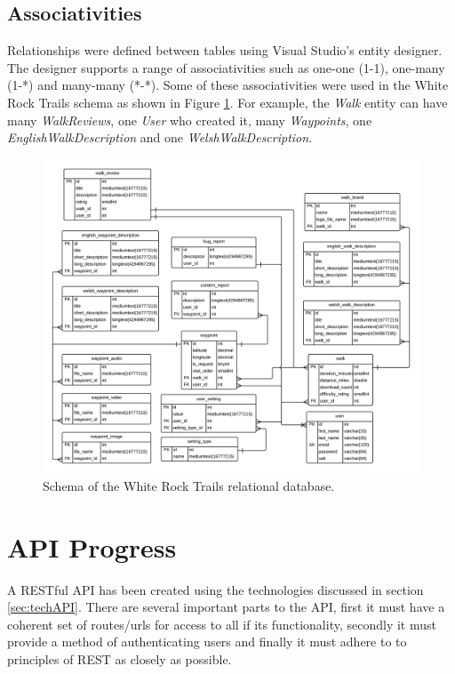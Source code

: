 \documentclass[11pt,a4paper]{article}
\begin{document}
\subsection{Associativities}

Relationships were defined between tables using Visual Studio's entity designer.
The designer supports a range of associativities such as one-one (1-1), one-many (1-*) and many-many (*-*).
Some of these associativities were used in the White Rock Trails schema as shown in Figure \ref{fig:DatabaseSchema}.
For example, the \emph{Walk} entity can have many \emph{WalkReviews}, one \emph{User} who created it, many \emph{Waypoints}, one \emph{EnglishWalkDescription} and one \emph{WelshWalkDescription}.

\begin{figure}[H]
\centering
\includegraphics[angle=90, width=1\textwidth]{./img/DatabaseSchema}
\caption{Schema of the White Rock Trails relational database.}
\label{fig:DatabaseSchema}
\end{figure}

\section{API Progress}

A RESTful API has been created using the technologies discussed in section \ref{sec:techAPI}. There are several important parts to the API, first it must have a coherent set of routes/urls for access to all if its functionality, secondly it must provide a method of authenticating users and finally it must adhere to to principles of REST as closely as possible.
\end{document}
